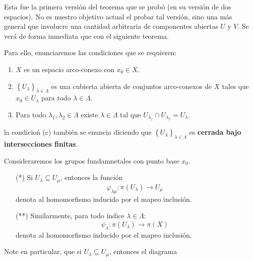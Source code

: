 \documentclass[12pt]{report}
\theoremstyle{largebreak}
\newcommand\cf[3]{\ensuremath{#1:#2\rightarrow#3}}
\begin{document}
    Esta fue la primera versión del teorema que se probó (en su versión de dos espacios). No es nuestro objetivo actual el probar tal versión, sino una más general que involucre una cantidad arbitraria de componentes abiertas $U$ y $V$. Se verá de forma inmediata que con el siguiente teorema.

    Para ello, enunciaremos las condiciones que se requieren:

    \renewcommand{\theenumi}{\alph{enumi}}
    \begin{enumerate}
        \item $X$ es un espacio arco-conexo con $x_0\in X$.
        \item  $\left\{U_\lambda \right\}_{\lambda\in\Lambda}$ es una cubierta abierta de conjuntos arco-conexos de $X$ tales que $x_0\in U_\lambda$ para todo $\lambda\in\Lambda$.
        \item Para todo $\lambda_1,\lambda_2\in\Lambda$ existe $\lambda\in\Lambda$ tal que $U_{\lambda_1}\cap U_{\lambda_2}=U_\lambda$.
    \end{enumerate}

    la condicioń (c) también se enuncia diciendo que $\left\{U_\lambda \right\}_{\lambda\in\Lambda}$ es \textbf{cerrada bajo intersecciones finitas}.

    Consideraremos los grupos fundamnetales con punto base $x_0$.

    \begin{itemize}
        \item[(*)] Si $U_\lambda\subseteq U_\mu$, entonces la función
        \begin{equation*}
            \cf{\varphi_{ \lambda\mu}}{\pi(U_\lambda)}{U_\mu}
        \end{equation*}
        denota al homomorfismo inducido por el mapeo inclusión.
        \item[(**)] Similarmente, para todo índice $\lambda\in\Lambda$:
        \begin{equation*}
            \cf{\psi_\lambda}{\pi(U_\lambda)}{\pi(X)}
        \end{equation*}
        denota al homomorfismo inducido por el mapeo inclusión.
    \end{itemize}

    Note en particular, que si $U_\lambda\subseteq U_\mu$, entonces el diagrama
\end{document}
